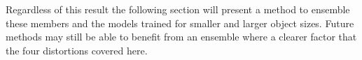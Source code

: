 Regardless of this result the following section will present a method to ensemble these members and the models trained for smaller and larger object sizes. Future methods may still be able to benefit from an ensemble where a clearer factor that the four distortions covered here.
\newpage

